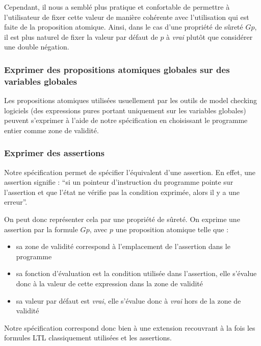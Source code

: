 Cependant, il nous a semblé plus pratique et confortable de permettre à
l'utilisateur de fixer cette valeur de manière cohérente avec
l'utilisation qui est faite de la proposition atomique. Ainsi, dans le
cas d'une propriété de sûreté \(G p\), il est plus naturel de fixer la
valeur par défaut de \(p\) à \emph{vrai} plutôt que considérer une
double négation.

\subsubsection{Exprimer des propositions atomiques globales sur des
variables globales}

Les propositions atomiques utilisées usuellement par les outils de model
checking logiciels (des expressions pures portant uniquement sur les
variables globales) peuvent s'exprimer à l'aide de notre spécification
en choisissant le programme entier comme zone de validité.

\subsubsection{Exprimer des assertions}

Notre spécification permet de spécifier l'équivalent d'une assertion. En
effet, une assertion signifie : ``si un pointeur d'instruction du
programme pointe sur l'assertion et que l'état ne vérifie pas la
condition exprimée, alors il y a une erreur''.

On peut donc représenter cela par une propriété de sûreté. On exprime
une assertion par la formule \(G p\), avec \(p\) une proposition
atomique telle que :

\begin{itemize}
\item
  sa zone de validité correspond à l'emplacement de l'assertion dans le
  programme
\item
  sa fonction d'évaluation est la condition utilisée dans l'assertion,
  elle s'évalue donc à la valeur de cette expression dans la zone de
  validité
\item
  sa valeur par défaut est \emph{vrai}, elle s'évalue donc à \emph{vrai}
  hors de la zone de validité
\end{itemize}

Notre spécification correspond donc bien à une extension recouvrant à la
fois les formules LTL classiquement utilisées et les assertions.